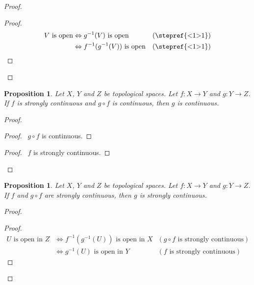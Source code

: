\documentclass{report}
\let\qed\relax
\newtheorem{prop}[lm]{Proposition}
\theoremstyle{definition}
\begin{document}
  \begin{proof}
    \pf
    \begin{proof}
      \pf
      \begin{align*}
        V \text{ is open} & \Leftrightarrow g^{-1}(V) \text{ is open} &
        (\text{\stepref{<1>1}}) \\
        & \Leftrightarrow f^{-1}(g^{-1}(V)) \text{ is open} &
        (\text{\stepref{<1>1}})
      \end{align*}
    \end{proof}
    \qed
  \end{proof}

  \begin{prop}
    Let $X$, $Y$ and $Z$ be topological spaces.
    Let $f : X \rightarrow Y$ and $g : Y \rightarrow Z$. If $f$ is strongly
    continuous and $g \circ f$ is continuous, then $g$ is continuous.
  \end{prop}

  \begin{proof}
    \pf
    \begin{proof}
      \pf\ $g \circ f$ is continuous.
    \end{proof}
    \begin{proof}
      \pf\ $f$ is strongly continuous.
    \end{proof}
    \qed
  \end{proof}

  \begin{prop}
    Let $X$, $Y$ and $Z$ be topological spaces. Let $f : X \rightarrow Y$ and
    $g
    : Y \rightarrow Z$. If $f$ and $g \circ f$ are strongly continuous, then
    $g$
    is
    strongly continuous.
  \end{prop}

  \begin{proof}
    \pf
    \begin{proof}
      \pf
      \begin{align*}
        U \text{ is open in } Z & \Leftrightarrow f^{-1}(g^{-1}(U)) \text{ is
          open in } X & (g \circ f \text{ is strongly continuous}) \\
        & \Leftrightarrow g^{-1}(U) \text{ is open in } Y & (f \text{ is
          strongly continuous})
      \end{align*}
    \end{proof}
    \qed
  \end{proof}
\end{document}
